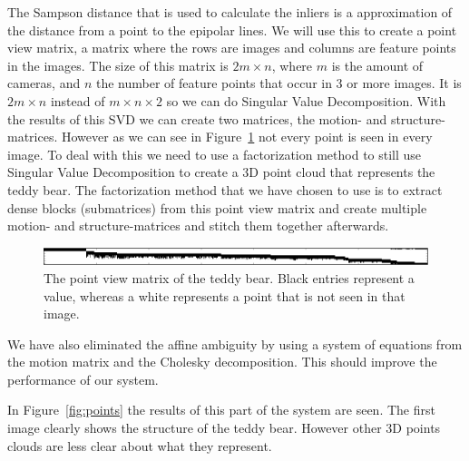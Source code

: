 The Sampson distance that is used to calculate the inliers is a approximation of the distance from a point to the epipolar lines.
We will use this to create a point view matrix, a matrix where the rows are images and columns are feature points in the images.
The size of this matrix is $2m \times n$, where $m$ is the amount of cameras, and $n$ the number of feature points that occur in 3 or more images. 
It is $2m \times n$ instead of $m \times n \times 2$ so we can do Singular Value Decomposition.
With the results of this SVD we can create two matrices, the motion- and structure-matrices.
However as we can see in Figure~\ref{fig:pvm} not every point is seen in every image.
To deal with this we need to use a factorization method to still use Singular Value Decomposition to create a 3D point cloud that represents the teddy bear.
The factorization method that we have chosen to use is to extract dense blocks (submatrices) from this point view matrix and create multiple motion- and structure-matrices and stitch them together afterwards.

\begin{figure}[ht]
	\centering
	\includegraphics[width=\textwidth]{pvm}
	\caption{The point view matrix of the teddy bear. Black entries represent a value, whereas a white represents a point that is not seen in that image.}
	\label{fig:pvm}
\end{figure}

We have also eliminated the affine ambiguity by using a system of equations from the motion matrix and the Cholesky decomposition. This should improve the performance of our system.

In Figure~\ref{fig:points} the results of this part of the system are seen. The first image clearly shows the structure of the teddy bear. However other 3D points clouds are less clear about what they represent.


